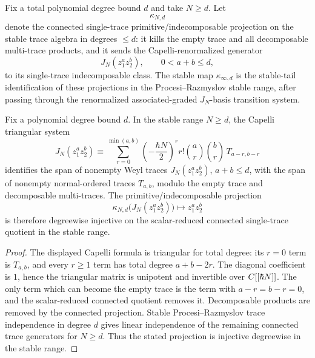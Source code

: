 \begin{defn}
\label{def:app-radial-stable-primitive-extraction}
  Fix a total polynomial degree bound \(d\) and take \(N\geq d\).  Let
  \[
    \kappa_{N,d}
  \]
  denote the connected single-trace primitive/indecomposable projection on the stable
  trace algebra in degrees \(\leq d\): it kills the empty trace and
  all decomposable multi-trace products, and it sends the
  Capelli-renormalized generator
  \[
    J_N(z_1^az_2^b),\qquad 0<a+b\leq d,
  \]
  to its single-trace indecomposable class.  The stable map
  \(\kappa_{\infty,d}\) is the stable-tail identification of these
  projections in the Procesi--Razmyslov stable range, after passing
  through the renormalized associated-graded \(J_N\)-basis transition
  system.
\end{defn}

\begin{lem}
\label{lem:app-radial-connected-projection}
  Fix a polynomial degree bound \(d\).  In the stable range
  \(N\geq d\), the Capelli triangular system
  \[
    J_N(z_1^az_2^b)\equiv
      \sum_{r=0}^{\min(a,b)}
        \left(-\frac{\hbar N}{2}\right)^r
        r!\binom ar\binom br\,T_{a-r,b-r}
  \]
  identifies the span of nonempty Weyl traces \(J_N(z_1^az_2^b)\),
  \(a+b\leq d\), with the span of nonempty normal-ordered traces
  \(T_{a,b}\), modulo the empty trace and decomposable multi-traces.
  The primitive/indecomposable projection
  \[
    \kappa_{N,d}\bigl(J_N(z_1^az_2^b)\bigr)
      \longmapsto z_1^az_2^b
  \]
  is therefore degreewise injective on the scalar-reduced connected
  single-trace quotient in the stable range.
\end{lem}

\begin{proof}
  The displayed Capelli formula is triangular for total degree:
  its \(r=0\) term is \(T_{a,b}\), and every \(r\geq1\) term has total
  degree \(a+b-2r\).  The diagonal coefficient is \(1\), hence the
  triangular matrix is unipotent and invertible over
  \(C[[\hbar N]]\).  The only term which can become the empty trace is
  the term with \(a-r=b-r=0\), and the scalar-reduced connected quotient
  removes it.  Decomposable products are removed by the connected
  projection.  Stable Procesi--Razmyslov trace independence in degree
  \(d\) gives linear independence of the remaining connected trace
  generators for \(N\geq d\).  Thus the stated projection is injective
  degreewise in the stable range.
\end{proof}

